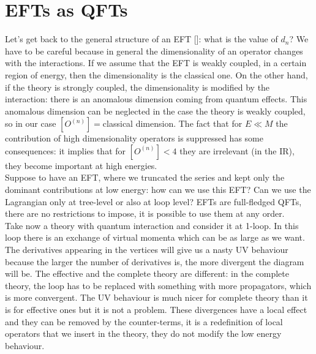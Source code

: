 \documentclass[../main.tex]{subfiles}
\begin{document}
\section{EFTs as QFTs}
Let's get back to the general structure of an EFT []: what is the value of $d_n$? We have to be careful because in general the dimensionality of an operator changes with the interactions. If we assume that the EFT is weakly coupled, in a certain region of energy, then the dimensionality is the classical one. On the other hand, if the theory is strongly coupled, the dimensionality is modified by the interaction: there is an anomalous dimension coming from quantum effects. This anomalous dimension can be neglected in the case the theory is weakly coupled, so in our case $[O^{(n)}]=$classical dimension. The fact that for $E\ll M$ the contribution of high dimensionality operators is suppressed has some consequences: it implies that for $[O^{(n)}]<4$ they are irrelevant (in the IR), they become important at high energies.\\
Suppose to have an EFT, where we truncated the series and kept only the dominant contributions at low energy: how can we use this EFT? Can we use the Lagrangian only at tree-level or also at loop level? EFTs are full-fledged QFTs, there are no restrictions to impose, it is possible to use them at any order.\\
Take now a theory with quantum interaction and consider it at 1-loop. In this loop there is an exchange of virtual momenta which can be as large as we want. The derivatives appearing in the vertices will give us a nasty UV behaviour because the larger the number of derivatives is, the more divergent the diagram will be. The effective and the complete theory are different: in the complete theory, the loop has to be replaced with something with more propagators, which is more convergent. The UV behaviour is much nicer for complete theory than it is for effective ones but it is not a problem. These divergences have a local effect and they can be removed by the counter-terms, it is a redefinition of local operators that we insert in the theory, they do not modify the low energy behaviour.
\end{document}
